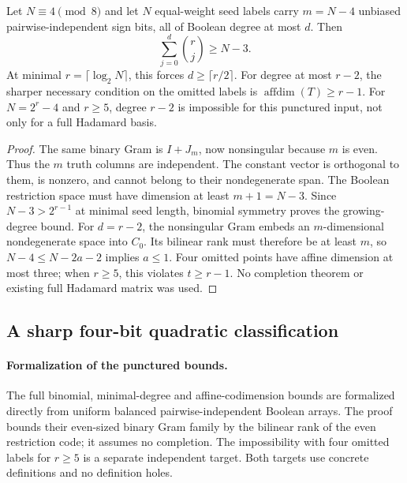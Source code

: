 \begin{theorem}
\label{s21:thm:nonlinear-punctured}
Let $N\equiv4\pmod8$ and let $N$ equal-weight seed labels carry $m=N-4$
unbiased pairwise-independent sign bits, all of Boolean degree at most
$d$. Then
\[
 \sum_{j=0}^d\binom rj\ge N-3.
\]
At minimal $r=\lceil\log_2N\rceil$, this forces
$d\ge\lceil r/2\rceil$. For degree at most $r-2$, the sharper necessary
condition on the omitted labels is $\operatorname{affdim}(T)\ge r-1$.
For $N=2^r-4$ and $r\ge5$, degree $r-2$ is impossible for this punctured
input, not only for a full Hadamard basis.
\end{theorem}
\begin{proof}
The same binary Gram is $I+J_m$, now nonsingular because $m$ is even.
Thus the $m$ truth columns are independent. The constant vector is
orthogonal to them, is nonzero, and cannot belong to their nondegenerate
span. The Boolean restriction space must have dimension at least
$m+1=N-3$. Since $N-3>2^{r-1}$ at minimal seed length, binomial symmetry
proves the growing-degree bound.
For $d=r-2$, the nonsingular Gram embeds an $m$-dimensional nondegenerate
space into $C_0$. Its bilinear rank must therefore be at least $m$,
so $N-4\le N-2a-2$ implies $a\le1$. Four omitted points have affine
dimension at most three; when $r\ge5$, this violates $t\ge r-1$.
No completion theorem or existing full Hadamard matrix was used.
\end{proof}

\subsection{A sharp four-bit quadratic classification}
\paragraph{Formalization of the punctured bounds.}
The full binomial, minimal-degree and affine-codimension bounds are
formalized directly from uniform balanced pairwise-independent Boolean
arrays. The proof bounds their even-sized binary Gram family by the
bilinear rank of the even restriction code; it assumes no completion.
The impossibility with four omitted labels for $r\ge5$ is a separate
independent target. Both targets use concrete definitions and no
definition holes.

